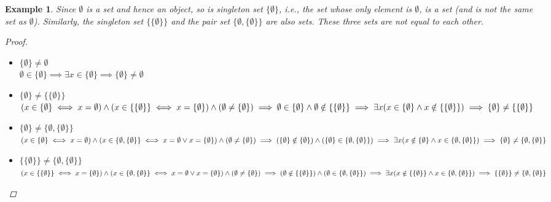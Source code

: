 \documentclass[a4paper]{book}
\newtheorem*{proof}{\textit{Proof.}}
\newtheorem{example}{Example}[section]
\begin{document}
			\begin{example}
				Since $\emptyset$ is a set and hence an object, so is singleton set $\{\emptyset\}$, \textit{i.e.,} the set whose only element is $\emptyset$, is a set (and is not the same set as $\emptyset$). Similarly, the singleton set $\{\{\emptyset\}\}$ and the pair set $\{\emptyset,\{\emptyset\}\}$ are also sets. These three sets are not equal to each other.
				\begin{proof}~
					\begin{itemize}
						\item $\{\emptyset\}\neq\emptyset$\\
						$\emptyset\in\{\emptyset\}\implies\exists x\in\{\emptyset\}\implies\{\emptyset\}\neq\emptyset$
						\item $\{\emptyset\}\neq\{\{\emptyset\}\}$\\
						$(x\in\{\emptyset\}\iff x=\emptyset)\land(x\in\{\{\emptyset\}\}\iff x=\{\emptyset\})\land(\emptyset\neq\{\emptyset\})\\\implies \emptyset\in\{\emptyset\}\land \emptyset\notin\{\{\emptyset\}\}\\\implies\exists x(x\in\{\emptyset\}\land x\notin\{\{\emptyset\}\})\\\implies\{\emptyset\}\neq\{\{\emptyset\}\}$
						\item $\{\emptyset\}\neq\{\emptyset,\{\emptyset\}\}$\\
						$(x\in\{\emptyset\}\iff x=\emptyset)\land(x\in\{\emptyset,\{\emptyset\}\}\iff x=\emptyset\lor x=\{\emptyset\})\land(\emptyset\neq\{\emptyset\})\\\implies (\{\emptyset\}\notin\{\emptyset\})\land(\{\emptyset\}\in\{\emptyset,\{\emptyset\}\})\\\implies\exists x(x\notin\{\emptyset\}\land x\in\{\emptyset,\{\emptyset\}\})\\\implies\{\emptyset\}\neq\{\emptyset,\{\emptyset\}\}$
						\item $\{\{\emptyset\}\}\neq\{\emptyset,\{\emptyset\}\}$\\
						$(x\in\{\{\emptyset\}\}\iff x=\{\emptyset\})\land(x\in\{\emptyset,\{\emptyset\}\}\iff x=\emptyset\lor x=\{\emptyset\})\land(\emptyset\neq\{\emptyset\})\\\implies (\emptyset\notin\{\{\emptyset\}\})\land(\emptyset\in\{\emptyset,\{\emptyset\}\})\\\implies\exists x(x\notin\{\{\emptyset\}\}\land x\in\{\emptyset,\{\emptyset\}\})\\\implies\{\{\emptyset\}\}\neq\{\emptyset,\{\emptyset\}\}$
					\end{itemize}
				\end{proof}
			\end{example}
\end{document}
